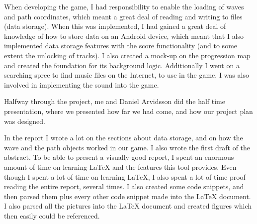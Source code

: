 When developing the game, I had responsibility to enable the loading of waves and path coordinates, which meant a great deal of reading and writing to files (data storage). When this was implemented, I had gained a great deal of knowledge of how to store data on an Android device, which meant that I also implemented data storage features with the score functionality (and to some extent the unlocking of tracks). I also created a mock-up on the progression map and created the foundation for its background logic. Additionally I went on a searching spree to find music files on the Internet, to use in the game. I was also involved in implementing the sound into the game.

Halfway through the project, me and Daniel Arvidsson did the half time presentation, where we presented how far we had come, and how our project plan was designed.

In the report I wrote a lot on the sections about data storage, and on how the wave and the path objects worked in our game. I also wrote the first draft of the abstract. To be able to present a visually good report, I spent an enormous amount of time on learning LaTeX and the features this tool provides. Even though I spent a lot of time on learning LaTeX, I also spent a lot of time proof reading the entire report, several times. I also created some code snippets, and then parsed them plus every other code snippet made into the LaTeX document. I also parsed all the pictures into the LaTeX document and created figures which then easily could be referenced.


